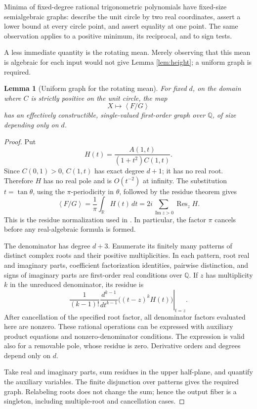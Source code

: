 \documentclass[11pt]{article}
\newtheorem{lemma}[theorem]{Lemma}
\theoremstyle{remark}\newtheorem{remark}[theorem]{Remark}
\newcommand{\Q}{\mathbb Q}
\newcommand{\R}{\mathbb R}
\newcommand{\mean}[1]{\left\langle #1\right\rangle}
\begin{document}
Minima of fixed-degree rational trigonometric polynomials have fixed-size semialgebraic graphs: describe the unit circle by two real coordinates, assert a lower bound at every circle point, and assert equality at one point. The same observation applies to a positive minimum, its reciprocal, and to sign tests.

A less immediate quantity is the rotating mean. Merely observing that this mean is algebraic for each input would not give Lemma \ref{lem:height}; a uniform graph is required.

\begin{lemma}[Uniform graph for the rotating mean]\label{lem:mean}
For fixed \(d\), on the domain where \(C\) is strictly positive on the unit circle, the map
\[
               X\longmapsto\mean{F/G}
\]
has an effectively constructible, single-valued first-order graph over \(\Q\), of size depending only on \(d\).
\end{lemma}

\begin{proof}
Put
\[
             H(t)=\frac{A(1,t)}{(1+t^2)C(1,t)}.
\]
Since \(C(0,1)>0\), \(C(1,t)\) has exact degree \(d+1\); it has no real root. Therefore \(H\) has no real pole and is \(O(t^{-2})\) at infinity. The substitution \(t=\tan\theta\), using the \(\pi\)-periodicity in \(\theta\), followed by the residue theorem gives
\begin{equation}\label{eq:meanresidue}
 \mean{F/G}=\frac1\pi\int_\R H(t)\,dt
           =2i\sum_{\operatorname{Im}z>0}\operatorname{Res}_zH .
\end{equation}
This is the residue normalization used in \cite[Theorem 20.3]{KordaSupp}. In particular, the factor \(\pi\) cancels before any real-algebraic formula is formed.

The denominator has degree \(d+3\). Enumerate its finitely many patterns of distinct complex roots and their positive multiplicities. In each pattern, root real and imaginary parts, coefficient factorization identities, pairwise distinction, and signs of imaginary parts are first-order real conditions over \(\Q\). If \(z\) has multiplicity \(k\) in the unreduced denominator, its residue is
\[
 \frac1{(k-1)!}
 \left.\frac{d^{k-1}}{dt^{k-1}}\bigl((t-z)^kH(t)\bigr)\right|_{t=z}.
\]
After cancellation of the specified root factor, all denominator factors evaluated here are nonzero. These rational operations can be expressed with auxiliary product equations and nonzero-denominator conditions. The expression is valid also for a removable pole, whose residue is zero. Derivative orders and degrees depend only on \(d\).

Take real and imaginary parts, sum residues in the upper half-plane, and quantify the auxiliary variables. The finite disjunction over patterns gives the required graph. Relabeling roots does not change the sum; hence the output fiber is a singleton, including multiple-root and cancellation cases.
\end{proof}
\end{document}
